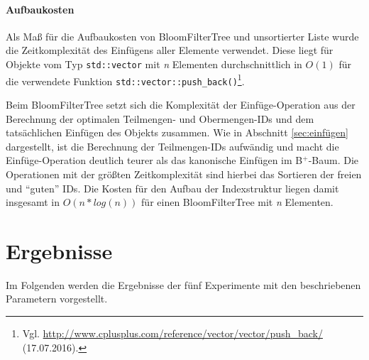 \paragraph*{Aufbaukosten}
Als Maß für die Aufbaukosten von BloomFilterTree und unsortierter Liste wurde die Zeitkomplexität des Einfügens aller Elemente verwendet. Diese liegt für Objekte vom Typ \texttt{std::vector} mit \textit{n} Elementen durchschnittlich in $O(1)$ für die verwendete Funktion \texttt{std::vector::push\_back()}\footnote{Vgl. \url{http://www.cplusplus.com/reference/vector/vector/push_back/} (17.07.2016).}. 

Beim BloomFilterTree setzt sich die Komplexität der Einfüge-Operation aus der Berechnung der optimalen Teilmengen- und Obermengen-IDs und dem tatsächlichen Einfügen des Objekts zusammen. Wie in Abschnitt \ref{sec:einfügen} dargestellt, ist die Berechnung der Teilmengen-IDs aufwändig und macht die Einfüge-Operation deutlich teurer als das kanonische Einfügen im B$^+$-Baum. Die Operationen mit der größten Zeitkomplexität sind hierbei das Sortieren der freien und "`guten"' IDs. Die Kosten für den Aufbau der Indexstruktur liegen damit insgesamt in $O(n\ast log(n))$ für einen BloomFilterTree mit \textit{n} Elementen. 
\section{Ergebnisse}\label{sec:ergebnisse}
Im Folgenden werden die Ergebnisse der fünf Experimente mit den beschriebenen Parametern vorgestellt. 
